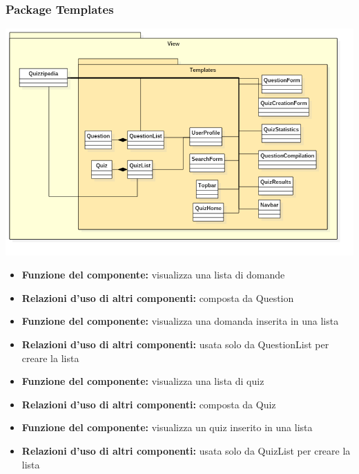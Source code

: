	\subsubsection{Package Templates}
		\begin{center}
			\includegraphics[scale=0.6]{../images/Templates.png}
		\end{center}
			\begin{itemize}
				\item\textbf{Funzione del componente:} visualizza una lista di domande
				\item\textbf{Relazioni d'uso di altri componenti:} composta da Question
			\end{itemize}
			\begin{itemize}
				\item\textbf{Funzione del componente:} visualizza una domanda inserita in una lista
				\item\textbf{Relazioni d'uso di altri componenti:} usata solo da QuestionList per creare la lista
			\end{itemize}
			\begin{itemize}
				\item\textbf{Funzione del componente:} visualizza una lista di quiz
				\item\textbf{Relazioni d'uso di altri componenti:} composta da Quiz
			\end{itemize}
			\begin{itemize}
				\item\textbf{Funzione del componente:} visualizza un quiz inserito in una lista
				\item\textbf{Relazioni d'uso di altri componenti:} usata solo da QuizList per creare la lista
			\end{itemize}
